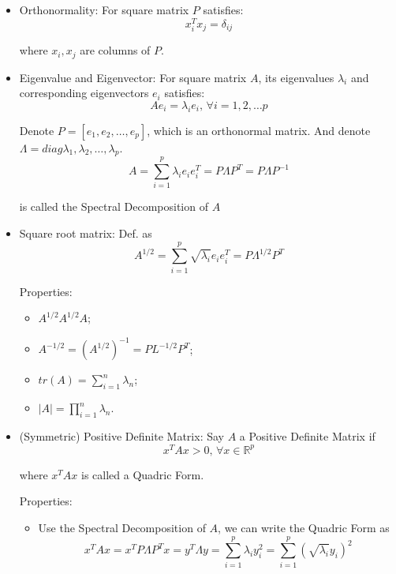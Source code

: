     \begin{itemize}[topsep=6pt,itemsep=4pt]
        \item Orthonormality: For square matrix $ P $ satisfies:
        \[
            x_i^Tx_j=\delta _{ij} 
        \]

        where $ x_i,x_j $ are columns of $ P $.
        \item Eigenvalue and Eigenvector: For square matrix $ A $, its eigenvalues $ \lambda_i $ and corresponding eigenvectors $ e_i $ satisfies:
        \[
            Ae_i=\lambda_ie_i,\,\forall i=1,2,\ldots p 
        \]

        Denote $ P=[e_1,e_2,\ldots ,e_p] $, which is an orthonormal matrix. And denote $ \Lambda =diag{\lambda _1,\lambda _2,\ldots,\lambda _p} $.
        \[
            A=\sum_{i=1}^p\lambda _ie_ie_i^T=P \Lambda P^T=P\Lambda P^{-1}
        \]

        is called the Spectral Decomposition of $ A $
        \item Square root matrix: Def. as
        \[
            A^{1/2}=\sum_{i=1}^p\sqrt{\lambda _i}e_ie_i^T=P\Lambda ^{1/2}P^T 
        \]

        Properties:
        \begin{itemize}[topsep=0pt,itemsep=-2pt]
            \item $ {\displaystyle A^{1/2}A^{1/2}A} $;
            \item $ {\displaystyle A^{-1/2}=(A^{1/2})^{-1}=PL^{-1/2}}P^T $;
            \item $ tr(A) =\sum_{i=1}^n\lambda _n$;
            \item $ |A|=\prod_{i=1}^n\lambda _n $.
        \end{itemize}
        
            
        \item (Symmetric) Positive Definite Matrix: Say $ A $ a Positive Definite Matrix if
        \[
            x^TAx> 0,\,\forall x\in\mathbb{R}^p 
        \]

        where $ x^TAx $ is called a Quadric Form.

        Properties:
        \begin{itemize}[topsep=6pt,itemsep=4pt]
            \item Use the Spectral Decomposition of $ A $, we can write the Quadric Form as
            \[
                x^TAx=x^TP\Lambda P^Tx=y^T\Lambda y=\sum_{i=1}^p\lambda_iy_i^2=\sum_{i=1}^p(\sqrt{\lambda_i}y_i)^2 
            \]
            

\end{itemize}
\end{itemize}
